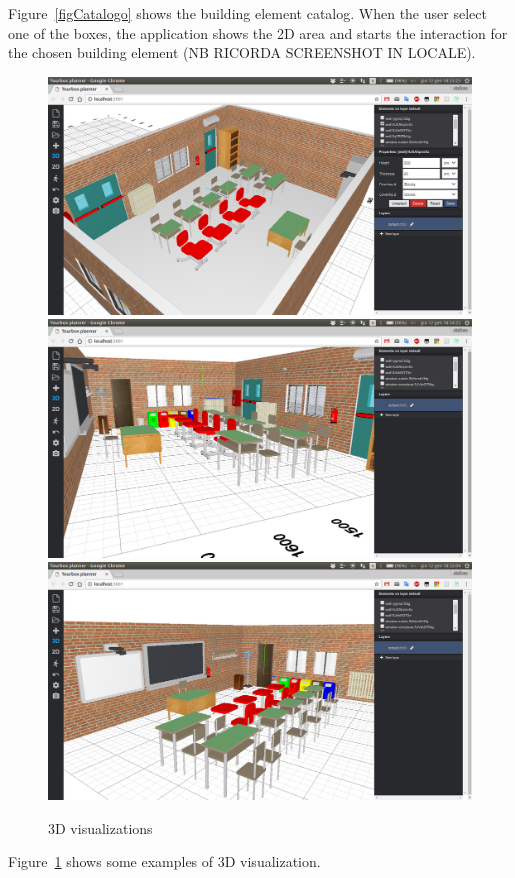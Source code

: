 Figure~\ref{figCatalogo} shows the building element catalog. When the user select one of the boxes, the application shows the 2D area and starts the interaction for the chosen building element (NB RICORDA SCREENSHOT IN LOCALE).

\begin{figure}[htb]
\centering
\includegraphics[width=0.45\linewidth]{contents/images/fig3d-1}
\includegraphics[width=0.45\linewidth]{contents/images/fig3d-2}\\
\includegraphics[width=0.9\linewidth]{contents/images/fig3d-3}
\caption{3D visualizations}
\label{fig3D}
\end{figure}

Figure~\ref{fig3D} shows some examples of 3D visualization.

